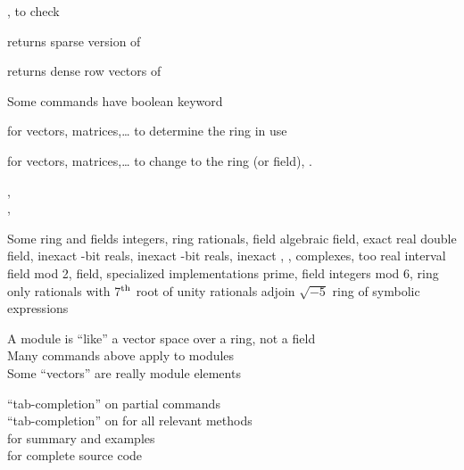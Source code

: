 \documentclass[a4paper]{article}
\begin{document}
\begin{multicols*}{3}
,   to check

 returns sparse version of 

 returns dense row vectors of 

Some commands have  boolean  keyword



 for vectors, matrices,\dots \BreakLineAndIndent
to determine the ring in use

 for vectors, matrices,\dots  \BreakLineAndIndent
to change to the ring (or field), .

,\quad{}\\
,\quad{}

Some ring and fields                   \BreakLineAndIndent
{}\quad integers, ring     \BreakLineAndIndent
{}\quad rationals, field   \BreakLineAndIndent
{}\quad algebraic field, exact  \BreakLineAndIndent
{}\quad real double field, inexact \BreakLineAndIndent
{}-bit reals, inexact       \BreakLineAndIndent
{}-bit reals, inexact \BreakLineAndDoubleIndent
{},
,
\quad
 complexes, too \BreakLineAndIndent
{}\quad real interval field \BreakLineAndIndent
{}\quad mod 2, field, specialized implementations \BreakLineAndIndent
{}\quad {} prime, field \BreakLineAndIndent
{}\quad integers mod 6, ring only \BreakLineAndIndent
{}\quad rationals with 7$^{\rm th}$ root of unity \BreakLineAndIndent
{}\quad rationals adjoin $\sqrt{-5}$\BreakLineAndIndent
{}\quad ring of symbolic expressions


A module is ``like'' a vector space over a ring, not a field\\
Many commands above apply to modules\\
Some ``vectors'' are really module elements


``tab-completion'' on partial commands\\
``tab-completion'' on  for all relevant methods\\
 for summary and examples\\
 for complete source code
%
\end{multicols*}
\end{document}
